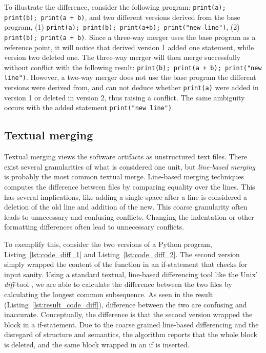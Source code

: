 \documentclass[a4paper,english]{ifimaster}
\begin{document}
To illustrate the difference, consider the following program: \texttt{print(a); print(b); print(a + b)}, and two different versions derived from the base program, (1) \texttt{print(a); print(b); print(a+b); print("new line")}, (2) \texttt{print(b); print(a + b)}. Since a three-way merger uses the base program as a reference point, it will notice that derived version 1 added one statement, while version two deleted one. The three-way merger will then merge successfully without conflict with the following result: \texttt{print(b); print(a + b); print("new line")}. However, a two-way merger does not use the base program the different versions were derived from, and can not deduce whether \texttt{print(a)} were added in version 1 or deleted in version 2, thus raising a conflict. The same ambiguity occurs with the added statement \texttt{print("new line")}.

\subsection{Textual merging}%
\label{sub:textual_merging}

Textual merging views the software artifacts as unstructured text files. There exist several granularities of what is considered one unit, but \textit{line-based merging} is probably the most common textual merge. Line-based merging techniques computes the difference between files by comparing equality over the lines. This has several implications, like adding a single space after a line is considered a deletion of the old line and addition of the new. This coarse granularity often leads to unnecessary and confusing conflicts. Changing the indentation or other formatting differences often lead to unnecessary conflicts.

To exemplify this, consider the two versions of a Python program, Listing~\vref{lst:code_diff_1} and Listing~\vref{lst:code_diff_2}. The second version simply wrapped the content of the function in an if-statement that checks for input sanity. Using a standard textual, line-based differencing tool like the Unix' \textit{diff}-tool \cite{cite:fast_algo_for_lcs}, we are able to calculate the difference between the two files by calculating the longest common subsequence. As seen in the result (Listing~\vref{lst:result_code_diff}), difference between the two are confusing and inaccurate. Conceptually, the difference is that the second version wrapped the block in a if-statement. Due to the coarse grained line-based differencing and the disregard of structure and semantics, the algorithm reports that the whole block is deleted, and the same block wrapped in an if is inserted.
\end{document}
